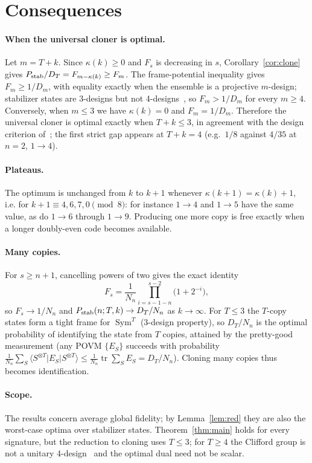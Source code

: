 \documentclass[11pt]{article}
\newcommand{\tr}{\operatorname{tr}}
\newcommand{\Sym}{\operatorname{Sym}}
\newcommand{\ket}[1]{\lvert #1\rangle}
\newcommand{\bra}[1]{\langle #1\rvert}
\theoremstyle{definition}
\theoremstyle{remark}
\begin{document}
\section{Consequences}
\paragraph{When the universal cloner is optimal.} Let $m=T+k$. Since $\kappa(k)\ge0$ and $F_s$ is decreasing in $s$,
Corollary~\ref{cor:clone} gives $P_{\rm stab}/D_T=F_{m-\kappa(k)}\ge F_m$. The frame-potential inequality gives
$F_m\ge1/D_m$, with equality exactly when the ensemble is a projective $m$-design; stabilizer states are 3-designs but
not 4-designs~\cite[Cor.~1]{KuengGross2015}, so $F_m>1/D_m$ for every $m\ge4$. Conversely, when $m\le3$ we have
$\kappa(k)=0$ and $F_m=1/D_m$. Therefore the universal cloner is optimal exactly when $T+k\le3$, in agreement with the
design criterion of~\cite{WeldonP2}; the first strict gap appears at $T+k=4$ (e.g.\ $1/8$ against $4/35$ at $n=2$,
$1\to4$).

\paragraph{Plateaus.} The optimum is unchanged from $k$ to $k+1$ whenever $\kappa(k+1)=\kappa(k)+1$, i.e. for
$k+1\equiv4,6,7,0\pmod8$: for instance $1\to4$ and $1\to5$ have the same value, as do $1\to6$ through $1\to9$.
Producing one more copy is free exactly when a longer doubly-even code becomes available.

\paragraph{Many copies.} For $s\ge n+1$, cancelling powers of two gives the exact identity
\[F_s=\frac1{N_n}\prod_{i=s-1-n}^{s-2}\big(1+2^{-i}\big),\]
so $F_s\to1/N_n$ and $P_{\rm stab}(n;T,k)\to D_T/N_n$ as $k\to\infty$.
For $T\le3$ the $T$-copy states form a tight frame for $\Sym^T$ (3-design property), so $D_T/N_n$ is the optimal
probability of identifying the state from $T$ copies, attained by the pretty-good measurement (any POVM $\{E_S\}$ succeeds with probability
$\frac1{N_n}\sum_S\bra{S^{\otimes T}}E_S\ket{S^{\otimes T}}\le\frac1{N_n}\tr\sum_SE_S=D_T/N_n$). Cloning many copies
thus becomes identification.

\paragraph{Scope.} The results concern average global fidelity; by Lemma~\ref{lem:red} they are also the worst-case
optima over stabilizer states. Theorem~\ref{thm:main} holds for every signature, but the reduction to cloning uses
$T\le3$; for $T\ge4$ the Clifford group is not a unitary 4-design~\cite{ZKGG2016} and the optimal dual need not be
scalar.
\end{document}
